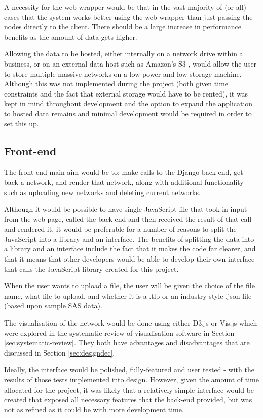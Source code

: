 \documentclass[../dissertation.tex]{subfiles}
\begin{document}
A necessity for the web wrapper would be that in the vast majority of (or all) cases that the system works better using the web wrapper than just passing the nodes directly to the client. There should be a large increase in performance benefits as the amount of data gets higher.

Allowing the data to be hosted, either internally on a network drive within a business, or on an external data host such as Amazon's S3 \cite{amazons3}, would allow the user to store multiple massive networks on a low power and low storage machine. Although this was not implemented during the project (both given time constraints and the fact that external storage would have to be rented), it was kept in mind throughout development and the option to expand the application to hosted data remains and minimal development would be required in order to set this up.

\subsection{Front-end}

The front-end main aim would be to: make calls to the Django back-end, get back a network, and render that network, along with additional functionality such as uploading new networks and deleting current networks. 

Although it would be possible to have single JavaScript file that took in input from the web page, called the back-end and then received the result of that call and rendered it, it would be preferable for a number of reasons to split the JavaScript into a library and an interface. The benefits of splitting the data into a library and an interface include the fact that it makes the code far clearer, and that it means that other developers would be able to develop their own interface that calls the JavaScript library created for this project.

When the user wants to upload a file, the user will be given the choice of the file name, what file to upload, and whether it is a .tlp or an industry style .json file (based upon sample SAS data).

The visualisation of the network would be done using either D3.js or Vis.js which were explored in the systematic review of visualisation software in Section \ref{sec:systematic-review}. They both have advantages and disadvantages that are discussed in Section \ref{sec:designdec}. 

Ideally, the interface would be polished, fully-featured and user tested - with the results of those tests implemented into design. However, given the amount of time allocated for the project, it was likely that a relatively simple interface would be created that exposed all necessary features that the back-end provided, but was not as refined as it could be with more development time.
\end{document}
